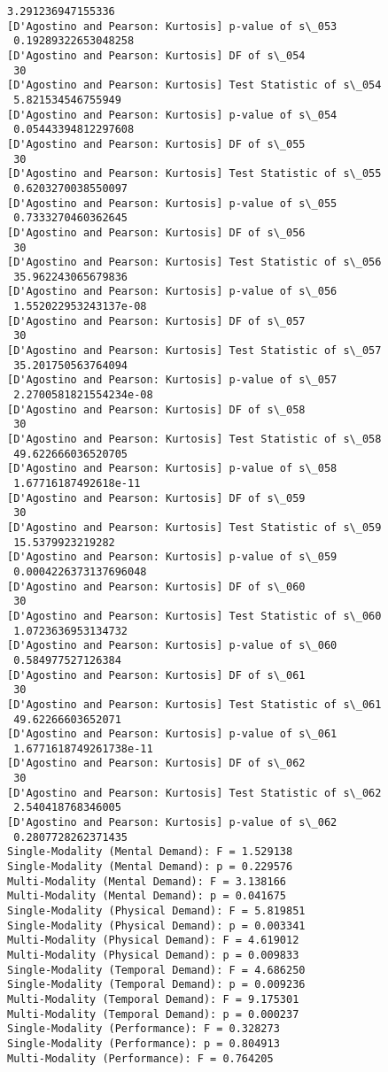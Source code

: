 \documentclass[11pt]{article}
\begin{document}
\begin{Verbatim}[commandchars=\\\{\}]
 3.291236947155336
[D'Agostino and Pearson: Kurtosis] p-value of s\_053
 0.19289322653048258
[D'Agostino and Pearson: Kurtosis] DF of s\_054
 30
[D'Agostino and Pearson: Kurtosis] Test Statistic of s\_054
 5.821534546755949
[D'Agostino and Pearson: Kurtosis] p-value of s\_054
 0.05443394812297608
[D'Agostino and Pearson: Kurtosis] DF of s\_055
 30
[D'Agostino and Pearson: Kurtosis] Test Statistic of s\_055
 0.6203270038550097
[D'Agostino and Pearson: Kurtosis] p-value of s\_055
 0.7333270460362645
[D'Agostino and Pearson: Kurtosis] DF of s\_056
 30
[D'Agostino and Pearson: Kurtosis] Test Statistic of s\_056
 35.962243065679836
[D'Agostino and Pearson: Kurtosis] p-value of s\_056
 1.552022953243137e-08
[D'Agostino and Pearson: Kurtosis] DF of s\_057
 30
[D'Agostino and Pearson: Kurtosis] Test Statistic of s\_057
 35.201750563764094
[D'Agostino and Pearson: Kurtosis] p-value of s\_057
 2.2700581821554234e-08
[D'Agostino and Pearson: Kurtosis] DF of s\_058
 30
[D'Agostino and Pearson: Kurtosis] Test Statistic of s\_058
 49.622666036520705
[D'Agostino and Pearson: Kurtosis] p-value of s\_058
 1.67716187492618e-11
[D'Agostino and Pearson: Kurtosis] DF of s\_059
 30
[D'Agostino and Pearson: Kurtosis] Test Statistic of s\_059
 15.5379923219282
[D'Agostino and Pearson: Kurtosis] p-value of s\_059
 0.0004226373137696048
[D'Agostino and Pearson: Kurtosis] DF of s\_060
 30
[D'Agostino and Pearson: Kurtosis] Test Statistic of s\_060
 1.0723636953134732
[D'Agostino and Pearson: Kurtosis] p-value of s\_060
 0.584977527126384
[D'Agostino and Pearson: Kurtosis] DF of s\_061
 30
[D'Agostino and Pearson: Kurtosis] Test Statistic of s\_061
 49.62266603652071
[D'Agostino and Pearson: Kurtosis] p-value of s\_061
 1.6771618749261738e-11
[D'Agostino and Pearson: Kurtosis] DF of s\_062
 30
[D'Agostino and Pearson: Kurtosis] Test Statistic of s\_062
 2.540418768346005
[D'Agostino and Pearson: Kurtosis] p-value of s\_062
 0.2807728262371435
Single-Modality (Mental Demand): F = 1.529138
Single-Modality (Mental Demand): p = 0.229576
Multi-Modality (Mental Demand): F = 3.138166
Multi-Modality (Mental Demand): p = 0.041675
Single-Modality (Physical Demand): F = 5.819851
Single-Modality (Physical Demand): p = 0.003341
Multi-Modality (Physical Demand): F = 4.619012
Multi-Modality (Physical Demand): p = 0.009833
Single-Modality (Temporal Demand): F = 4.686250
Single-Modality (Temporal Demand): p = 0.009236
Multi-Modality (Temporal Demand): F = 9.175301
Multi-Modality (Temporal Demand): p = 0.000237
Single-Modality (Performance): F = 0.328273
Single-Modality (Performance): p = 0.804913
Multi-Modality (Performance): F = 0.764205

\end{Verbatim}
\end{document}
